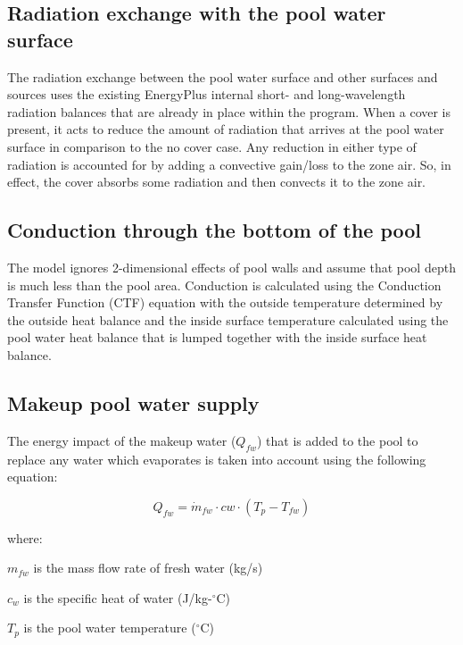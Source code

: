 \subsection{Radiation exchange with the pool water surface}\label{radiation-exchange-with-the-pool-water-surface}

The radiation exchange between the pool water surface and other surfaces and sources uses the existing EnergyPlus internal short- and long-wavelength radiation balances that are already in place within the program. When a cover is present, it acts to reduce the amount of radiation that arrives at the pool water surface in comparison to the no cover case. Any reduction in either type of radiation is accounted for by adding a convective gain/loss to the zone air. So, in effect, the cover absorbs some radiation and then convects it to the zone air.

\subsection{Conduction through the bottom of the pool}\label{conduction-through-the-bottom-of-the-pool}

The model ignores 2-dimensional effects of pool walls and assume that pool depth is much less than the pool area. Conduction is calculated using the Conduction Transfer Function (CTF) equation with the outside temperature determined by the outside heat balance and the inside surface temperature calculated using the pool water heat balance that is lumped together with the inside surface heat balance.

\subsection{Makeup pool water supply}\label{makeup-pool-water-supply}

The energy impact of the makeup water (\(Q_{fw}\)) that is added to the pool to replace any water which evaporates is taken into account using the following equation:

\begin{equation}
Q_{fw} = \dot{m}_{fw} \cdot cw \cdot (T_p - T_{fw})
\end{equation}

where:

\(m_{fw}\) is the mass flow rate of fresh water (kg/s)

\(c_w\) is the specific heat of water (J/kg-\(^{\circ}\)C)

\(T_p\) is the pool water temperature (\(^{\circ}\)C)

